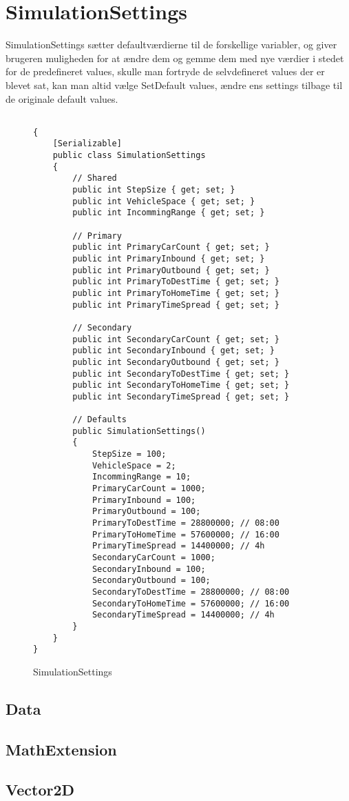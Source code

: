 \section{SimulationSettings}

SimulationSettings sætter defaultværdierne til de forskellige variabler, og giver brugeren muligheden for at ændre dem og gemme dem med nye værdier i stedet for de predefineret values, skulle man fortryde de selvdefineret values der er blevet sat, kan man altid vælge SetDefault values, ændre ens settings tilbage til de originale default values.

\begin{figure}[H]
\begin{lstlisting} 

{
    [Serializable]
    public class SimulationSettings
    {
        // Shared
        public int StepSize { get; set; }
        public int VehicleSpace { get; set; }
        public int IncommingRange { get; set; }

        // Primary
        public int PrimaryCarCount { get; set; }
        public int PrimaryInbound { get; set; }
        public int PrimaryOutbound { get; set; }
        public int PrimaryToDestTime { get; set; }
        public int PrimaryToHomeTime { get; set; }
        public int PrimaryTimeSpread { get; set; }

        // Secondary
        public int SecondaryCarCount { get; set; }
        public int SecondaryInbound { get; set; }
        public int SecondaryOutbound { get; set; }
        public int SecondaryToDestTime { get; set; }
        public int SecondaryToHomeTime { get; set; }
        public int SecondaryTimeSpread { get; set; }

        // Defaults
        public SimulationSettings()
        {
            StepSize = 100;
            VehicleSpace = 2;
            IncommingRange = 10;
            PrimaryCarCount = 1000;
            PrimaryInbound = 100;
            PrimaryOutbound = 100;
            PrimaryToDestTime = 28800000; // 08:00
            PrimaryToHomeTime = 57600000; // 16:00
            PrimaryTimeSpread = 14400000; // 4h
            SecondaryCarCount = 1000;
            SecondaryInbound = 100;
            SecondaryOutbound = 100;
            SecondaryToDestTime = 28800000; // 08:00
            SecondaryToHomeTime = 57600000; // 16:00
            SecondaryTimeSpread = 14400000; // 4h
        }
    }
}
\end{lstlisting}
\caption{SimulationSettings}\label{SimulationSettings}
\end{figure}

\subsection{Data}
\subsection{MathExtension}
\subsection{Vector2D}